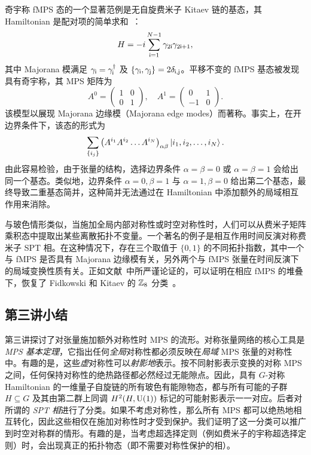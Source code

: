 奇宇称 fMPS 态的一个显著范例是无自旋费米子 Kitaev 链的基态，其 Hamiltonian 是配对项的简单求和~\cite{Kitaev2000}：
\begin{equation}
    H = -i\sum_{\mathsf i=1}^{N-1} \gamma_{2\mathsf i}\gamma_{2\mathsf i+1},
\end{equation}
其中 Majorana 模满足 $\gamma_\mathsf i=\gamma^\dagger_\mathsf i$ 及 $\{\gamma_\mathsf i, \gamma_\mathsf j\}=2\delta_{\mathsf i,\mathsf j}$。平移不变的 fMPS 基态被发现具有奇宇称，其 MPS 矩阵为
\begin{equation}\label{eq:KitaevTensor}
    A^0 =
    \begin{pmatrix}
        1 & 0 \\
        0 & 1
    \end{pmatrix}, \quad
    A^1 =
    \begin{pmatrix}
        0 & 1 \\
        -1 & 0
    \end{pmatrix}.
\end{equation}
该模型以展现 Majorana 边缘模（Majorana edge modes）而著称。事实上，在开边界条件下，该态的形式为
\begin{equation}
    \sum_{\{i_j\}} \big(A^{i_1}A^{i_2}\dots A^{i_N}\big)_{\alpha\beta} \ket{i_1,i_2,\dots,i_N}.
\end{equation}
由此容易检验，由于张量的结构，选择边界条件 $\alpha=\beta=0$ 或 $\alpha=\beta=1$ 会给出同一个基态。类似地，边界条件 $\alpha=0,\beta=1$ 与 $\alpha=1,\beta=0$ 给出第二个基态，最终导致二重基态简并，这种简并无法通过在 Hamiltonian 中添加额外的局域相互作用来消除。

\bigskip\noindent 与玻色情形类似，当施加全局内部对称性或时空对称性时，人们可以从费米子矩阵乘积态中提取出某些离散拓扑不变量。一个著名的例子是相互作用时间反演对称费米子 SPT 相。在这种情况下，存在三个取值于 $\{0,1\}$ 的不同拓扑指数，其中一个与 fMPS 是否具有 Majorana 边缘模有关，另外两个与 fMPS 张量在时间反演下的局域变换性质有关。正如文献~\cite{Bultinck2016}中所严谨论证的，可以证明在相应 fMPS 的堆叠下，恢复了 Fidkowski 和 Kitaev 的 $\mathbb Z_8$ 分类~\cite{Fidkowski2010}。
\subsection{第三讲小结} 第三讲探讨了对张量施加额外对称性时 MPS 的流形。对称张量网络的核心工具是 \emph{MPS 基本定理}，它指出任何\emph{全局}对称性都必须反映在\emph{局域} MPS 张量的对称性中。有趣的是，这些\emph{虚}对称性可以\emph{射影地}表示。按不同射影表示变换的对称 MPS 之间，任何保持对称性的绝热路径都必然经过无能隙点。因此，具有 $G$-对称 Hamiltonian 的一维量子自旋链的所有玻色有能隙物态，都与所有可能的子群 $H\subseteq G$ 及其由第二群上同调 $H^2(H,{\rm U}(1))$ 标记的可能射影表示一一对应。后者对所谓的 \emph{SPT 相}进行了分类。如果不考虑对称性，那么所有 MPS 都可以绝热地相互转化，因此这些相仅在施加对称性时才受到保护。我们证明了这一分类可以推广到时空对称群的情形。有趣的是，当考虑超选择定则（例如费米子的宇称超选择定则）时，会出现真正的拓扑物态（即不需要对称性保护的相）。
